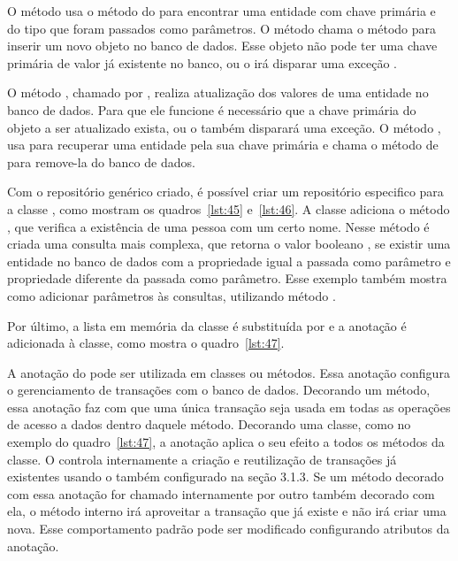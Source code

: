 O método  usa o método  do  para encontrar uma entidade com chave primária e do tipo que foram passados como parâmetros. O método  chama o método  para inserir um novo objeto no banco de dados. Esse objeto não pode ter uma chave primária de valor já existente no banco, ou o  irá disparar uma exceção .

O método , chamado por , realiza atualização dos valores de uma entidade no banco de dados. Para que ele funcione é necessário que a chave primária do objeto a ser atualizado exista, ou o  também disparará uma exceção. O método , usa  para recuperar uma entidade pela sua chave primária e chama o método  de  para remove-la do banco de dados.

Com o repositório genérico criado, é possível criar um repositório especifico para a classe , como mostram os quadros~\ref{lst:45} e~\ref{lst:46}. A classe  adiciona o método , que verifica a existência de uma pessoa com um certo nome. Nesse método é criada uma consulta mais complexa, que retorna o valor booleano , se existir uma entidade no banco de dados com a propriedade  igual a passada como parâmetro e propriedade  diferente da passada como parâmetro. Esse exemplo também mostra como adicionar parâmetros às consultas, utilizando método .



Por último, a lista em memória da classe  é substituída por  e a anotação  é adicionada à classe, como mostra o quadro~\ref{lst:47}.


A anotação  do  pode ser utilizada em classes ou métodos. Essa anotação configura o gerenciamento de transações com o banco de dados. Decorando um método, essa anotação faz com que uma única transação seja usada em todas as operações de acesso a dados dentro daquele método. Decorando uma classe, como no exemplo do quadro~\ref{lst:47}, a anotação aplica o seu efeito a todos os métodos da classe.  O  controla internamente a criação e reutilização de transações já existentes usando o   também configurado na seção 3.1.3. Se um método decorado com essa anotação for chamado internamente por outro também decorado com ela, o método interno irá aproveitar a transação que já existe e não irá criar uma nova. Esse comportamento padrão pode ser modificado configurando atributos da anotação. 

